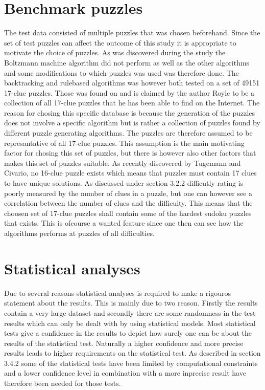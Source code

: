 \documentclass[a4paper,11pt]{kth-mag}
\begin{document}
\section{Benchmark puzzles}
The test data consisted of multiple puzzles that was chosen beforehand.
Since the set of test puzzles can affect the outcome of this study it is appropriate to motivate the choice of puzzles.
As was discovered during the study the Boltzmann machine algorithm did not perform as well as the other algorithms and some modifications to which puzzles was used was therefore done.
The backtracking and rulebased algorithms was however both tested on a set of 49151 17-clue puzzles. 
Those was found on \cite{database} and is claimed by the author Royle to be a collection of all 17-clue puzzles that he has been able to find on the Internet. 
The reason for chosing this specific database is because the generation of the puzzles does not involve a specific algorithm but is rather a collection of puzzles found by different puzzle generating algorithms.  
The puzzles are therefore assumed to be represantative of all 17-clue puzzles. 
This assumption is the main motivating factor for chosing this set of puzzles, but there is however also other factors that makes this set of puzzles suitable. 
As recently discovered by Tugemann and Civario, no 16-clue puzzle exists which means that puzzles must contain 17 clues to have unique solutions. \cite{17clueProof}  
As discussed under section 3.2.2 difficutly rating is poorly measured by the number of clues in a puzzle, but one can however see a correlation between the number of clues and the difficulty. \cite{difficulty}
This means that the choosen set of 17-clue puzzles shall contain some of the hardest sudoku puzzles that exists.
This is ofcourse a wanted feature since one then can see how the algorithms performs at puzzles of all difficulties.

\section{Statistical analyses}
Due to several reasons statistical analyses is required to make a rigouros statement about the results. 
This is mainly due to two reason.
Firstly the results contain a very large dataset and secondly there are some randomness in the test results which can only be dealt with by using statistical models. 
Most statistical tests give a confidence in the results to depict how surely one can be about the results of the statistical test. Naturally a higher confidence and more precise results leads to higher requirements on the statistical test. As described in section 3.4.2 some of the statistical tests have been limited by computational constraints and a lower confidence level in combination with a more inprecise result have therefore been needed for those tests.
\end{document}
